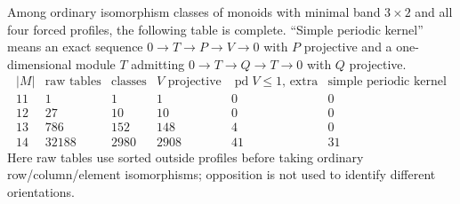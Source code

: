 \begin{lemma}
\label{C:forced-profile-row-certificates}
Among ordinary isomorphism classes of monoids with minimal
band $3\times2$ and all four forced profiles, the following
table is complete.  ``Simple periodic kernel'' means an exact
sequence $0\to T\to P\to V\to0$ with $P$ projective and a
one-dimensional module $T$ admitting
$0\to T\to Q\to T\to0$ with $Q$ projective.
\[
\begin{array}{c|r|r|r|r|r}
 |M|&\text{raw tables}&\text{classes}&
  V\text{ projective}&\operatorname{pd}V\leq1\text{, extra}&
  \text{simple periodic kernel}\\ \hline
 11&1&1&1&0&0\\
 12&27&10&10&0&0\\
 13&786&152&148&4&0\\
 14&32188&2980&2908&41&31
\end{array}
\]
Here raw tables use sorted outside profiles before taking
ordinary row/column/element isomorphisms; opposition is not
used to identify different orientations.
\end{lemma}
